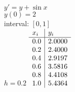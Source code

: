 {
$y' = y + \sin x$\\
$y(0)=2$\\
interval: $[0,1]$\\
$h = 0.2$
}
{
	$\begin{array}[b]{l | l}
		x_i & y_i    \\ \hline
		0.0 & 2.0000 \\
		0.2 & 2.4000 \\
		0.4 & 2.9197 \\
		0.6 & 3.5816 \\
		0.8 & 4.4108 \\
		1.0 & 5.4364
	\end{array}$
}